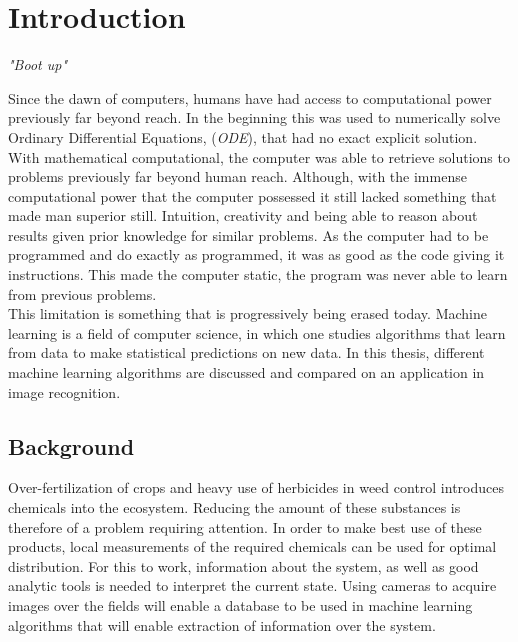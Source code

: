 \chapter{Introduction}
\begin{center}
\vspace{-6ex}
\textit{"Boot up"}
\vspace{6ex}
\end{center}

Since the dawn of computers, humans have had access to computational power previously far beyond reach. In the beginning this was used to numerically solve Ordinary Differential Equations, (\textit{ODE}), that had no exact explicit solution. With mathematical computational, the computer was able to retrieve solutions to problems previously far beyond human reach. Although, with the immense computational power that the computer possessed it still lacked something that made man superior still. Intuition, creativity and being able to reason about results given prior knowledge for similar problems. As the computer had to be programmed and do exactly as programmed, it was as good as the code giving it instructions. This made the computer static, the program was never able to learn from previous problems.\\

This limitation is something that is progressively being erased today. Machine learning is a field of computer science, in which one studies algorithms that learn from data to make statistical predictions on new data. In this thesis, different machine learning algorithms are discussed and compared on an application in image recognition.

\section{Background}

Over-fertilization of crops and heavy use of herbicides in weed control introduces chemicals into the ecosystem. Reducing the amount of these substances is therefore of a problem requiring attention. In order to make best use of these products, local measurements of the required chemicals can be used for optimal distribution. For this to work, information about the system, as well as good analytic tools is needed to interpret the current state. Using cameras to acquire images over the fields will enable a database to be used in machine learning algorithms that will enable extraction of information over the system.

